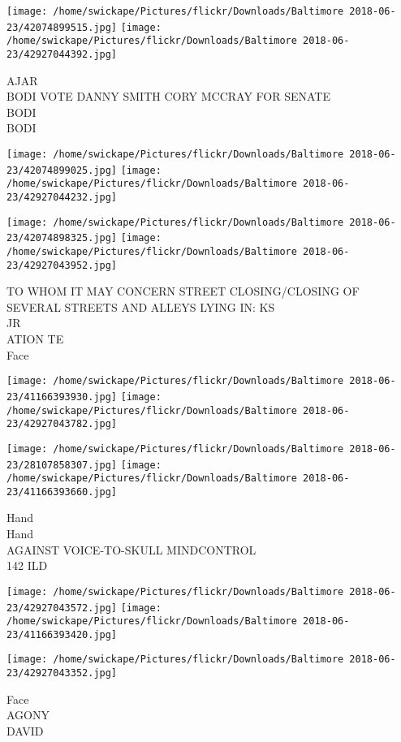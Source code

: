 \documentclass[10pt,letterpaper]{article}
\begin{document}
\texttt{[image: /home/swickape/Pictures/flickr/Downloads/Baltimore 2018-06-23/42074899515.jpg]}
\texttt{[image: /home/swickape/Pictures/flickr/Downloads/Baltimore 2018-06-23/42927044392.jpg]}

AJAR\\
BODI VOTE DANNY SMITH CORY MCCRAY FOR SENATE\\
BODI\\
BODI
\pagebreak

\texttt{[image: /home/swickape/Pictures/flickr/Downloads/Baltimore 2018-06-23/42074899025.jpg]}
\texttt{[image: /home/swickape/Pictures/flickr/Downloads/Baltimore 2018-06-23/42927044232.jpg]}

\texttt{[image: /home/swickape/Pictures/flickr/Downloads/Baltimore 2018-06-23/42074898325.jpg]}
\texttt{[image: /home/swickape/Pictures/flickr/Downloads/Baltimore 2018-06-23/42927043952.jpg]}

TO WHOM IT MAY CONCERN STREET CLOSING/CLOSING OF SEVERAL STREETS AND ALLEYS LYING IN: KS\\
JR\\
ATION TE\\
Face
\pagebreak

\texttt{[image: /home/swickape/Pictures/flickr/Downloads/Baltimore 2018-06-23/41166393930.jpg]}
\texttt{[image: /home/swickape/Pictures/flickr/Downloads/Baltimore 2018-06-23/42927043782.jpg]}

\texttt{[image: /home/swickape/Pictures/flickr/Downloads/Baltimore 2018-06-23/28107858307.jpg]}
\texttt{[image: /home/swickape/Pictures/flickr/Downloads/Baltimore 2018-06-23/41166393660.jpg]}

Hand\\
Hand\\
AGAINST VOICE{-}TO{-}SKULL MINDCONTROL\\
142 ILD
\pagebreak

\texttt{[image: /home/swickape/Pictures/flickr/Downloads/Baltimore 2018-06-23/42927043572.jpg]}
\texttt{[image: /home/swickape/Pictures/flickr/Downloads/Baltimore 2018-06-23/41166393420.jpg]}

\vspace{0.25in}
\texttt{[image: /home/swickape/Pictures/flickr/Downloads/Baltimore 2018-06-23/42927043352.jpg]}

Face\\
AGONY\\
DAVID
\pagebreak
\end{document}
